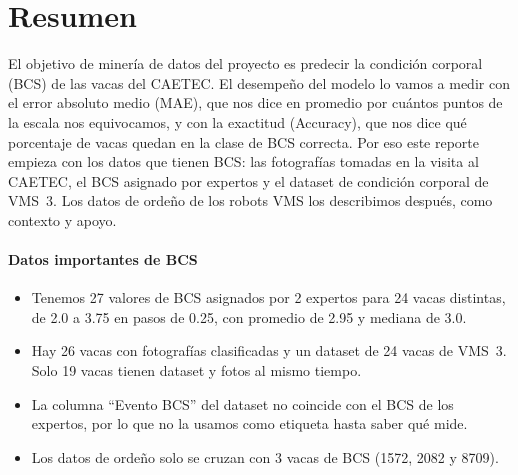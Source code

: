 \documentclass[11pt,letterpaper,DIV=12]{scrartcl}
\begin{document}


\tableofcontents

\section{Resumen}

El objetivo de minería de datos del proyecto es predecir la condición corporal (BCS) de las vacas del CAETEC. El desempeño del modelo lo vamos a medir con el error absoluto medio (MAE), que nos dice en promedio por cuántos puntos de la escala nos equivocamos, y con la exactitud (Accuracy), que nos dice qué porcentaje de vacas quedan en la clase de BCS correcta. Por eso este reporte empieza con los datos que tienen BCS: las fotografías tomadas en la visita al CAETEC, el BCS asignado por expertos y el dataset de condición corporal de VMS~3. Los datos de ordeño de los robots VMS los describimos después, como contexto y apoyo.

\paragraph{Datos importantes de BCS}
\begin{itemize}
  \item Tenemos 27 valores de BCS asignados por 2 expertos para 24 vacas distintas, de 2.0 a 3.75 en pasos de 0.25, con promedio de 2.95 y mediana de 3.0.
  \item Hay 26 vacas con fotografías clasificadas y un dataset de 24 vacas de VMS~3. Solo 19 vacas tienen dataset y fotos al mismo tiempo.
  \item La columna ``Evento BCS'' del dataset no coincide con el BCS de los expertos, por lo que no la usamos como etiqueta hasta saber qué mide.
  \item Los datos de ordeño solo se cruzan con 3 vacas de BCS (1572, 2082 y 8709).
\end{itemize}
\end{document}
